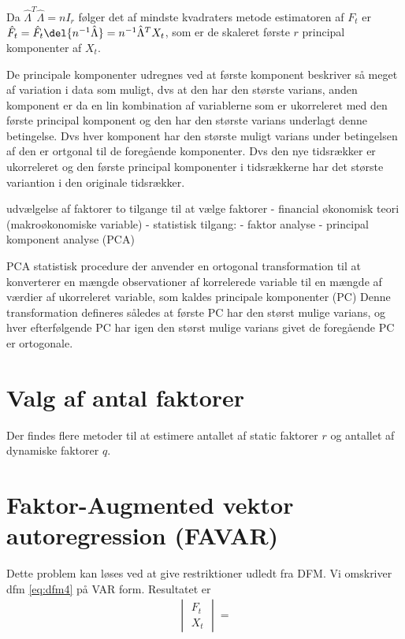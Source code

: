 Da $\hat{\Lambda}^T \hat{\Lambda}=nI_r$ følger det af mindste kvadraters metode estimatoren af $F_t$ er $\hat{F}_t=\hat{F}_t \del{n^{-1}\hat{\Lambda}}=n^{-1}\hat{\Lambda}^TX_t$, som er de skaleret første $r$ principal komponenter af $X_t$.

De principale komponenter udregnes ved at første komponent beskriver så meget af variation i data som muligt, dvs at den har den største varians, anden komponent er da en lin kombination af variablerne som er ukorreleret med den første principal komponent og den har den største varians underlagt denne betingelse.
Dvs hver komponent har den største muligt varians under betingelsen af den er ortgonal til de foregående komponenter.
Dvs den nye tidsrækker er ukorreleret og den første principal komponenter i tidsrækkerne har det største variantion i den originale tidsrækker.


udvælgelse af faktorer
to tilgange til at vælge faktorer
- financial økonomisk teori (makroøkonomiske variable)
- statistisk tilgang: 
- faktor analyse
- principal komponent analyse (PCA)

PCA
statistisk procedure der anvender en ortogonal transformation til at konverterer en mængde observationer af korrelerede variable til en mængde af værdier af ukorreleret variable, som kaldes principale komponenter (PC)
Denne transformation defineres således at første PC har den størst mulige varians, og hver efterfølgende PC har igen den størst mulige varians givet de foregående PC er ortogonale.


\section{Valg af antal faktorer}
Der findes flere metoder til at estimere antallet af static faktorer $r$ og antallet af dynamiske faktorer $q$.


\section{Faktor-Augmented vektor autoregression (FAVAR)}
Dette problem kan løses ved at give restriktioner udledt fra DFM.
Vi omskriver dfm \eqref{eq:dfm4} på VAR form.
Resultatet er 
\begin{align*}
\begin{vmatrix}
F_t \\ X_t
\end{vmatrix} = 
\end{align*}